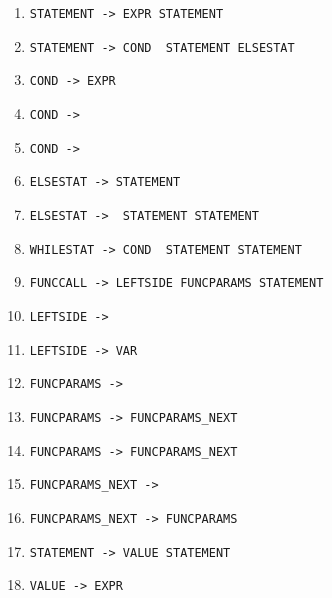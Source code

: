 \documentclass[a4paper, 12pt]{article} %
\begin{document}
{\begin{enumerate}[noitemsep]
                \item \texttt{STATEMENT ->  EXPR STATEMENT}
                \item \texttt{{STATEMENT ->  COND } 
                STATEMENT  ELSESTAT}
                \item \texttt{COND -> EXPR}
                \item \texttt{COND -> }
                \item \texttt{COND -> }
                \item \texttt{ELSESTAT -> STATEMENT}
                \item \texttt{{ELSESTAT -> } STATEMENT 
                STATEMENT}
                \item \texttt{{WHILESTAT ->  COND } 
                STATEMENT  STATEMENT}
                \item \texttt{FUNCCALL -> LEFTSIDE  FUNCPARAMS 
                 STATEMENT}
                \item \texttt{LEFTSIDE -> \blue{$\epsilon$}}
                \item \texttt{LEFTSIDE -> VAR }
                \item \texttt{FUNCPARAMS -> \blue{$\epsilon$}}
                \item \texttt{FUNCPARAMS ->  FUNCPARAMS\_NEXT}
                \item \texttt{FUNCPARAMS ->  FUNCPARAMS\_NEXT}
                \item \texttt{FUNCPARAMS\_NEXT -> \blue{$\epsilon$}}
                \item \texttt{FUNCPARAMS\_NEXT ->  FUNCPARAMS}
                \item \texttt{STATEMENT ->  VALUE STATEMENT}
                \item \texttt{VALUE -> EXPR}
            \end{enumerate}}
\end{document}
